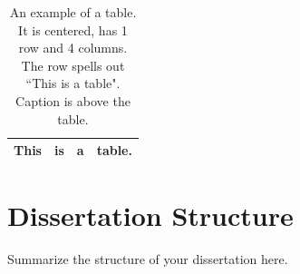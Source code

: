 \begin{table}[hbtp]
	\centering
	\caption[This is a very simple table.]{An example of a table.  It is centered, has 1 row and 4 columns.  The row spells out ``This is a table".  Caption is above the table.}
	\begin{tabular}{|c|c|c|c|}
	\hline
	This & is & a & table.\\
	\hline
	\end{tabular}
	\label{tab:tab1}
\end{table}



\section{Dissertation Structure}
\label{sec:struture}

Summarize the structure of your dissertation here.